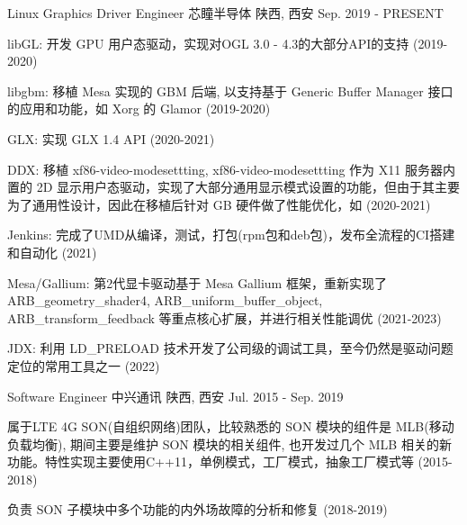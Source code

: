 
\begin{cventries}
  \cventry
    {Linux Graphics Driver Engineer} %
    {芯瞳半导体} %
    {陕西, 西安} %
    {Sep. 2019 - PRESENT} %
    {
      \begin{cvitems} %
        \item {libGL: 开发 GPU 用户态驱动，实现对OGL 3.0 - 4.3的大部分API的支持 (2019-2020)}
        \item {libgbm: 移植 Mesa 实现的 GBM 后端, 以支持基于 Generic Buffer Manager 接口的应用和功能，如 Xorg 的 Glamor (2019-2020)}
        \item {GLX: 实现 GLX 1.4 API (2020-2021)}
        \item {DDX: 移植 xf86-video-modesettting, xf86-video-modesettting 作为 X11 服务器内置的 2D 显示用户态驱动，实现了大部分通用显示模式设置的功能，但由于其主要为了通用性设计，因此在移植后针对 GB 硬件做了性能优化，如 (2020-2021)}
        \item {Jenkins: 完成了UMD从编译，测试，打包(rpm包和deb包)，发布全流程的CI搭建和自动化 (2021)}
        \item {Mesa/Gallium: 第2代显卡驱动基于 Mesa Gallium 框架，重新实现了 ARB\_geometry\_shader4,  ARB\_uniform\_buffer\_object, ARB\_transform\_feedback 等重点核心扩展，并进行相关性能调优 (2021-2023)}
        \item {JDX: 利用 LD\_PRELOAD 技术开发了公司级的调试工具，至今仍然是驱动问题定位的常用工具之一 (2022)}
      \end{cvitems}
    }

  \cventry
    {Software Engineer} %
    {中兴通讯} %
    {陕西, 西安} %
    {Jul. 2015 - Sep. 2019} %
    {
      \begin{cvitems} %
      \item {属于LTE 4G SON(自组织网络)团队，比较熟悉的 SON 模块的组件是 MLB(移动负载均衡), 期间主要是维护 SON 模块的相关组件, 也开发过几个 MLB 相关的新功能。特性实现主要使用C++11，单例模式，工厂模式，抽象工厂模式等 (2015-2018)}
      \item {负责 SON 子模块中多个功能的内外场故障的分析和修复 (2018-2019)}
      \end{cvitems}
    }
\end{cventries}
